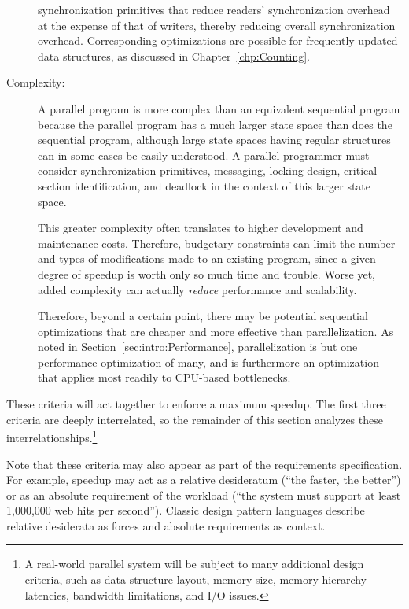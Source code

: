 \begin{description}
	synchronization primitives that reduce readers' synchronization
	overhead at the expense of that of writers, thereby
	reducing overall synchronization overhead.
	Corresponding optimizations are possible for frequently
	updated data structures, as discussed in
	Chapter~\ref{chp:Counting}.
\item[Complexity:]  A parallel program is more complex than
	an equivalent sequential program because the parallel program
	has a much larger state space than does the sequential program,
	although large state spaces having regular structures can in
	some cases be easily understood.
	A parallel programmer must
	consider synchronization primitives, messaging, locking design,
	critical-section identification,
	and deadlock in the context of this larger state space.

	This greater complexity often translates
	to higher development and maintenance costs.
	Therefore, budgetary constraints can
	limit the number and types of modifications made to
	an existing program, since a given degree of speedup is
	worth only so much time and trouble.
	Worse yet, added complexity can actually \emph{reduce}
	performance and scalability.

	Therefore, beyond a certain point,
	there may be potential sequential optimizations
	that are cheaper and more effective than parallelization.
	As noted in
	Section~\ref{sec:intro:Performance},
	parallelization is but one performance optimization of
	many, and is furthermore an optimization that applies
	most readily to CPU-based bottlenecks.
\end{description}
These criteria will act together to enforce a maximum speedup.
The first three criteria are deeply interrelated, so
the remainder of this section analyzes these
interrelationships.\footnote{
	A real-world parallel system will be subject to many additional
	design criteria, such as data-structure layout,
	memory size, memory-hierarchy latencies, bandwidth limitations,
	and I/O issues.}

Note that these criteria may also appear as part of the requirements
specification.
For example, speedup may act as a relative desideratum
(``the faster, the better'')
or as an absolute requirement of the workload (``the system
must support at least 1,000,000 web hits per second'').
Classic design pattern languages describe relative desiderata as forces
and absolute requirements as context.

